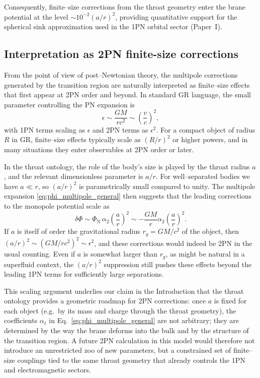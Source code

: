 \documentclass[12pt]{article}
\begin{document}
Consequently, finite--size corrections from the throat geometry enter the brane potential at the level
$\sim 10^{-2}(a/r)^2$, providing quantitative support for the spherical sink approximation used in the 1PN
orbital sector (Paper~I).

\subsection{Interpretation as 2PN finite-size corrections}
\label{subsec:2pn_interpretation}

From the point of view of post--Newtonian theory, the multipole corrections
generated by the transition region are naturally interpreted as finite--size
effects that first appear at 2PN order and beyond.  In standard GR language,
the small parameter controlling the PN expansion is
\begin{equation}
  \epsilon
  \sim \frac{GM}{rc^2}
  \sim \left(\frac{v}{c}\right)^2,
\end{equation}
with 1PN terms scaling as $\epsilon$ and 2PN terms as $\epsilon^2$.  For a
compact object of radius $R$ in GR, finite--size effects typically scale as
$(R/r)^2$ or higher powers, and in many situations they enter observables at
2PN order or later.

In the throat ontology, the role of the body's size is played by the throat
radius $a$, and the relevant dimensionless parameter is $a/r$.  For
well--separated bodies we have $a\ll r$, so $(a/r)^2$ is parametrically
small compared to unity.  The multipole expansion
\eqref{eq:phi_multipole_general} then suggests that the leading corrections
to the monopole potential scale as
\begin{equation}
  \delta\Phi
  \sim \Phi_{\mathrm{N}}\,
       \alpha_2 \left(\frac{a}{r}\right)^2
  \sim -\frac{GM}{r}
       \alpha_2 \left(\frac{a}{r}\right)^2.
\end{equation}
If $a$ is itself of order the gravitational radius $r_g=GM/c^2$ of the
object, then $(a/r)^2\sim (GM/rc^2)^2\sim\epsilon^2$, and these corrections
would indeed be 2PN in the usual counting.  Even if $a$ is somewhat larger
than $r_g$, as might be natural in a superfluid context, the $(a/r)^2$
suppression still pushes these effects beyond the leading 1PN terms for
sufficiently large separations.

This scaling argument underlies our claim in the Introduction that the
throat ontology provides a geometric roadmap for 2PN corrections: once $a$
is fixed for each object (e.g.\ by its mass and charge through the throat
geometry), the coefficients $\alpha_{\ell}$ in
Eq.~\eqref{eq:phi_multipole_general} are not arbitrary; they are determined
by the way the brane deforms into the bulk and by the structure of the
transition region.  A future 2PN calculation in this model would therefore
not introduce an unrestricted zoo of new parameters, but a constrained set
of finite--size couplings tied to the same throat geometry that already
controls the 1PN and electromagnetic sectors.
\end{document}
